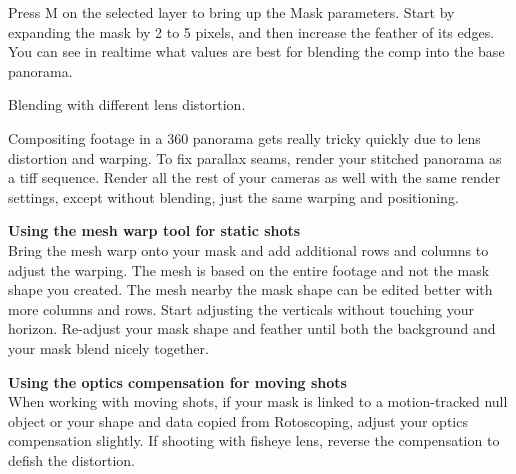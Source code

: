 \begin{fullwidth}

Press M on the selected layer to bring up the Mask parameters. Start by expanding the mask by 2 to 5 pixels, and then increase the feather of its edges. You can see in realtime what values are best for blending the comp into the base panorama. 


{\large Blending with different lens distortion. \par}

Compositing footage in a 360 panorama gets really tricky quickly due to lens distortion and warping. To fix parallax seams, render your stitched panorama as a tiff sequence. Render all the rest of your cameras as well with the same render settings, except without blending, just the same warping and positioning. 

{\bfseries Using the mesh warp tool for static shots}
\\
Bring the mesh warp onto your mask and add additional rows and columns to adjust the warping. The mesh is based on the entire footage and not the mask shape you created. The mesh nearby the mask shape can be edited better with more columns and rows. Start adjusting the verticals without touching your horizon. Re-adjust your mask shape and feather until both the background and your mask blend nicely together.

{\bfseries Using the optics compensation for moving shots}
\\
When working with moving shots, if your mask is linked to a motion-tracked null object or your shape and data copied from Rotoscoping, adjust your optics compensation slightly. If shooting with fisheye lens, reverse the compensation to defish the distortion. 



\clearpage
\end{fullwidth}